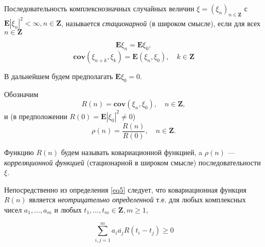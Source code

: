 \begin{definition}
Последовательность комплекснозначных случайных величин $\xi = (\xi_n)_{n \in \textbf{Z}}$ с $\textbf{E}|\xi_n|^2 < \infty, n \in \textbf{Z}$, называется \textit{стационарной} (в широком смысле), если для всех $n \in \textbf{Z}$

$$\textbf{E}\xi_n = \textbf{E}\xi_0,$$
\begin{equation}\label{eq4}
    \textbf{cov}(\xi_{n+k}, \xi_k) = \textbf{E}(\xi_n, \xi_0), \quad k \in \textbf{Z}
\end{equation}


В дальнейшем будем предполагать $\textbf{E}\xi_{0} = 0$. 


Обозначим 
\begin{equation}\label{eq5} 
    R(n)=\textbf{cov}(\xi_n, \xi_0), \quad n \in \textbf{Z},
\end{equation}
и (в предположении $R(0) = \textbf{E}|\xi_0|^2 \neq 0$)
\begin{equation}\label{eq6} 
    \rho (n) = \frac{R(n)}{R(0)}, \quad n \in \textbf{Z}.
\end{equation}


Функцию $R(n)$ будем называть ковариационной функцией, a $\rho(n)$ –– \textit{корреляционной функцией} (стационарной в широком смысле) последовательности $\xi$.

Непосредственно из определения \ref{eq5} следует, что ковариационная функция $R(n)$ является \textit{неотрицательно определенной} т.е. для любых комплексных чисел $a_1, ..., a_m$ и любых $t_1, ..., t_m \in \textbf{Z}, m \geq 1,$

\begin{equation}\label{eq7}
    \sum\limits_{i, j = 1}^{m} a_i \overline{a_j} R(t_i-t_j) \geq 0
\end{equation}



\end{definition}

